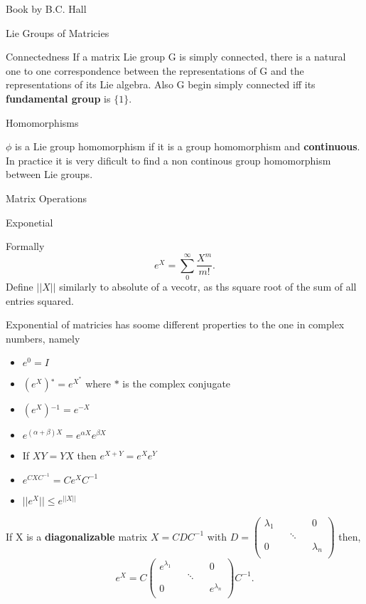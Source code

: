 \documentclass[12pt, letterpaper]{article}
\begin{document}
\begin{section}{Book by B.C. Hall}
\begin{subsection}{Lie Groups of Matricies}
\begin{subsubsection}{Connectedness}
      If a matrix Lie group G is simply connected, there is a natural one to one
      correspondence between the representations of G and the representations of
      its Lie algebra. Also G begin simply connected iff its \textbf{fundamental
        group} is \(\{1\}\).

    \end{subsubsection}

    \begin{subsubsection}{Homomorphisms}

      \(\phi\) is a Lie group homomorphism if it is a group homomorphism and
      \textbf{continuous}. In practice it is very dificult to find a non continous
      group homomorphism between Lie groups.

    \end{subsubsection}

  \end{subsection}

  \begin{subsection}{Matrix Operations}

    \begin{subsubsection}{Exponetial}

      Formally \[e^{X} = \sum^{\infty}_{0} \frac{X^{m}}{m!}.\]
      Define \(|| X ||\) similarly to absolute of a vecotr, as ths square root
      of the sum of all entries squared.

      Exponential of matricies has soome different properties to the one in
      complex numbers, namely
      \begin{itemize}
        \item \(e^{0} = I\)
        \item \((e^{X}){}^{*} = e^{X^{*}}\) where \(*\) is the complex conjugate
        \item \((e^{X}){}^{-1} = e^{-X}\)
        \item \(e^{(\alpha + \beta) X} = e^{\alpha X} e^{\beta X}\)
        \item If \(XY = YX\) then \(e^{X + Y} = e^{X}e^{Y}\)
        \item \(e^{CXC^{-1}} = Ce^{X}C^{-1}\)
        \item \(||e^{X}|| \leq e^{||X||}\)
      \end{itemize}

      If X is a \textbf{diagonalizable} matrix \(X = CDC^{-1}\) with
      \(D =
      \begin{pmatrix}
        \lambda_{1} && \; && 0 \\
        \; && \ddots && \; \\
        0 && \; && \lambda_{n}\\
      \end{pmatrix}\)
      then, \[e^{X} = C
        \begin{pmatrix}
          e^{\lambda_{1}} && \; && 0 \\
          \; && \ddots && \; \\
          0 && \; && e^{\lambda_{n}}\\
        \end{pmatrix} C^{-1}.\]


\end{subsubsection}
\end{subsection}
\end{section}
\end{document}
